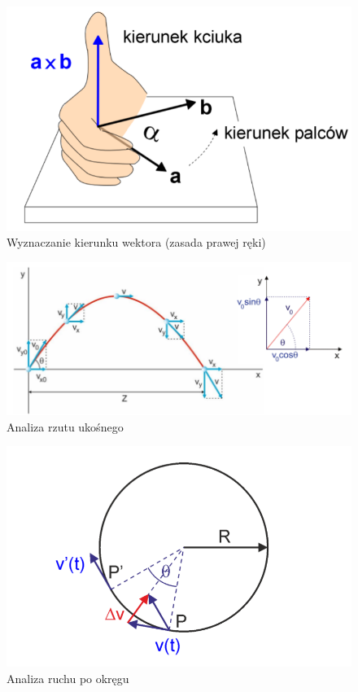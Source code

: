 \documentclass[12pt,twoside,a4paper]{book}
\begin{document}
\begin{center}
\vspace{1cm}
\begin{figure}
\caption{Wyznaczanie kierunku wektora (zasada prawej ręki)}
\includegraphics[width=\textwidth]{graphics/3}
\end{figure}

\vspace{1cm}
\begin{figure}
\caption{Analiza rzutu ukośnego}
\includegraphics[width=\textwidth]{graphics/4}
\end{figure}

\vspace{1cm}
\begin{figure}
\caption{Analiza ruchu po okręgu}
\includegraphics[width=\textwidth]{graphics/5}
\end{figure}


\end{center}
\end{document}
